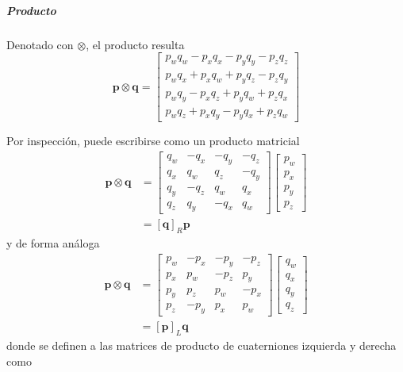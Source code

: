 \subparagraph{Producto}
Denotado con $\otimes$, el producto resulta
\begin{equation}
    \bm{p}\otimes\bm{q} = 
    \begin{bmatrix}
        p_wq_w - p_xq_x - p_yq_y - p_zq_z \\
        p_wq_x + p_xq_w + p_yq_z - p_zq_y \\
        p_wq_y - p_xq_z + p_yq_w + p_zq_x \\
        p_wq_z + p_xq_y - p_yq_x + p_zq_w
    \end{bmatrix}
\end{equation}

Por inspección, puede escribirse como un producto matricial
\begin{align}
    \bm{p}\otimes\bm{q} &= 
    \begin{bmatrix}
        q_w & -q_x & -q_y & -q_z \\
        q_x & q_w & q_z & -q_y \\
        q_y & -q_z & q_w & q_x \\
        q_z & q_y & -q_x & q_w
    \end{bmatrix}
    \begin{bmatrix}
        p_w \\
        p_x \\
        p_y \\
        p_z
    \end{bmatrix}
    \\
    &= 
    [\bm{q}]_R \bm{p}
    \label{eq:quaternionproductright}
\end{align}
y de forma análoga
\begin{align}
    \bm{p}\otimes\bm{q} &= 
    \begin{bmatrix}
        p_w & -p_x & -p_y & -p_z \\
        p_x & p_w & -p_z & p_y \\
        p_y & p_z & p_w & -p_x \\
        p_z & -p_y & p_x & p_w
    \end{bmatrix}
    \begin{bmatrix}
        q_w \\
        q_x \\
        q_y \\
        q_z
    \end{bmatrix}
    \\
    &= [\bm{p}]_L\bm{q}
    \label{eq:quaternionproductleft}
\end{align}
donde se definen a las matrices de producto de cuaterniones izquierda y derecha como
